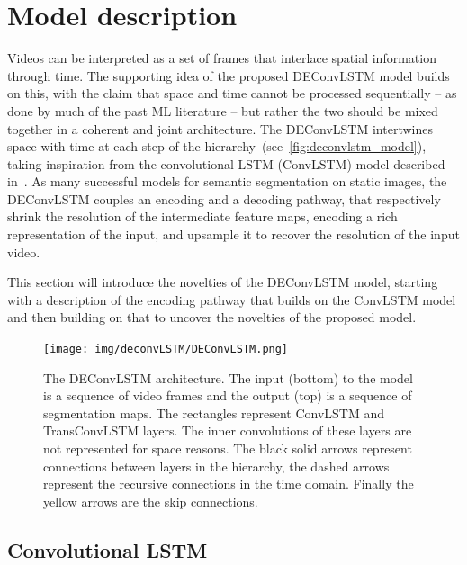 

\section{Model description}\label{sec:deconvlstm_model}

Videos can be interpreted as a set of frames that interlace spatial information
through time. The supporting idea of the proposed DEConvLSTM model builds on
this, with the claim that space and time cannot be processed sequentially -- as
done by much of the past ML literature -- but rather the two should be mixed
together in a coherent and joint architecture. The DEConvLSTM intertwines space
with time at each step of the hierarchy~(see~\autoref{fig:deconvlstm_model}),
taking inspiration from the convolutional LSTM (ConvLSTM) model described
in~\cite{ShiCWYWW15}.
As many successful models for semantic segmentation on static images, the
DEConvLSTM couples an encoding and a decoding pathway, that respectively shrink
the resolution of the intermediate feature maps, encoding a rich representation
of the input, and upsample it to recover the resolution of the input video.

This section will introduce the novelties of the DEConvLSTM model, starting
with a description of the encoding pathway that builds on the ConvLSTM model
and then building on that to uncover the novelties of the proposed model.

\begin{figure}[t]
    \centering
    \texttt{[image: img/deconvLSTM/DEConvLSTM.png]}
    \caption{The DEConvLSTM architecture. The input (bottom) to the model is a
        sequence of video frames and the output (top) is a sequence of
        segmentation maps. The rectangles represent ConvLSTM and TransConvLSTM
        layers. The inner convolutions of these layers are not represented for
        space reasons. The black solid arrows represent connections between
        layers in the hierarchy, the dashed arrows represent the recursive
        connections in the time domain. Finally the yellow arrows are the skip
        connections.}\label{fig:deconvlstm_model}
\end{figure}


\subsection{Convolutional LSTM}

